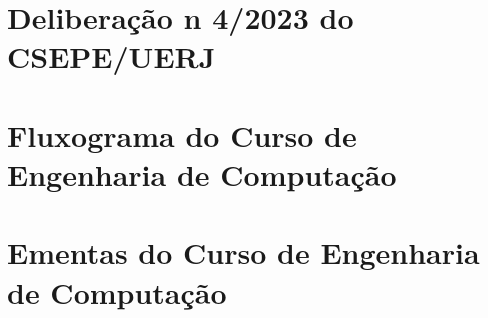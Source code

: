 \chapter{Deliberação n\textordmasculine{} 4/2023 do CSEPE/UERJ}
\label{del4}


\chapter{Fluxograma do Curso de Engenharia de Computação}
\label{fluxograma}

\chapter{Ementas do Curso de Engenharia de Computação}
\label{ementas}


















